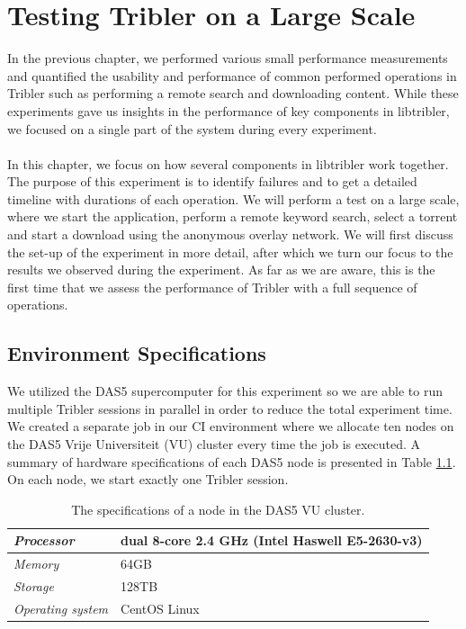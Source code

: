 \chapter{Testing Tribler on a Large Scale}
\label{chapter:large-scale-experiment}
In the previous chapter, we performed various small performance measurements and quantified the usability and performance of common performed operations in Tribler such as performing a remote search and downloading content. While these experiments gave us insights in the performance of key components in libtribler, we focused on a single part of the system during every experiment.\\\\
In this chapter, we focus on how several components in libtribler work together. The purpose of this experiment is to identify failures and to get a detailed timeline with durations of each operation. We will perform a test on a large scale, where we start the application, perform a remote keyword search, select a torrent and start a download using the anonymous overlay network. We will first discuss the set-up of the experiment in more detail, after which we turn our focus to the results we observed during the experiment. As far as we are aware, this is the first time that we assess the performance of Tribler with a full sequence of operations.

\section{Environment Specifications}
We utilized the DAS5 supercomputer for this experiment so we are able to run multiple Tribler sessions in parallel in order to reduce the total experiment time. We created a separate job in our CI environment where we allocate ten nodes on the DAS5 Vrije Universiteit (VU) cluster every time the job is executed. A summary of hardware specifications of each DAS5 node is presented in Table \ref{table:das5-node-specifications}. On each node, we start exactly one Tribler session.

\begin{table}[h!]
	\centering
	\begin{tabular}{|l|l|}
		\hline
		\emph{Processor} & dual 8-core 2.4 GHz (Intel Haswell E5-2630-v3)\\ \hline
		\emph{Memory} & 64GB \\ \hline
		\emph{Storage} & 128TB \\ \hline
		\emph{Operating system} & CentOS Linux \\ \hline
	\end{tabular}
	\caption{The specifications of a node in the DAS5 VU cluster.}
	\label{table:das5-node-specifications}
\end{table}

